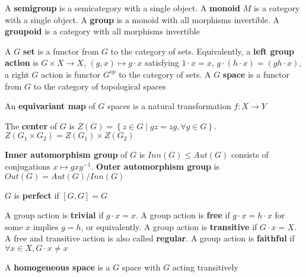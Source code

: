 \documentclass[main]{subfiles}
\begin{document}
\begin{definition}\label{Semigroup}
A \textbf{semigroup} is a semicategory with a single object. A \textbf{monoid} $M$ is a category with a single object. A \textbf{group} is a monoid with all morphisms invertible. A \textbf{groupoid} is a category with all morphisms invertible \par
A $G$ \textbf{set} is a functor from $G$ to the category of sets. Equivalently, a \textbf{left group action} is $G\times X\to X$, $(g,x)\mapsto g\cdot x$ satisfying $1\cdot x=x$, $g\cdot(h\cdot x)=(gh\cdot x)$, a right $G$ action is functor $G^{op}$ to the category of sets. A $G$ \textbf{space} is a functor from $G$ to the category of topological spaces \par
An \textbf{equivariant map} of $G$ spaces is a natural transformation $f:X\to Y$
\begin{center}
\end{center}
\end{definition}

\begin{definition}
The \textbf{center} of $G$ is $Z(G)=\left\{z\in G\middle|gz=zg,\forall g\in G\right\}$. $Z(G_1\times G_2)=Z(G_1)\times Z(G_2)$
\end{definition}

\begin{definition}
\textbf{Inner automorphism group} of $G$ is $Inn(G)\leq Aut(G)$ consists of conjugations $x\mapsto gx g^{-1}$. \textbf{Outer automorphism group} is $Out(G)=Aut(G)/Inn(G)$
\end{definition}

\begin{definition}
$G$ is \textbf{perfect} if $[G,G]=G$
\end{definition}

\begin{definition}
A group action is \textbf{trivial} if $g\cdot x=x$. A group action is \textbf{free} if $g\cdot x=h\cdot x$ for some $x$ implies $g=h$, or equivalently. A group action is \textbf{transitive} if $G\cdot x=X$. A free and transitive action is also called \textbf{regular}. A group action is \textbf{faithful} if $\forall x\in X, G\cdot x\neq x$ \par
A \textbf{homogeneous space} is a $G$ space with $G$ acting transitively
\end{definition}
\end{document}
